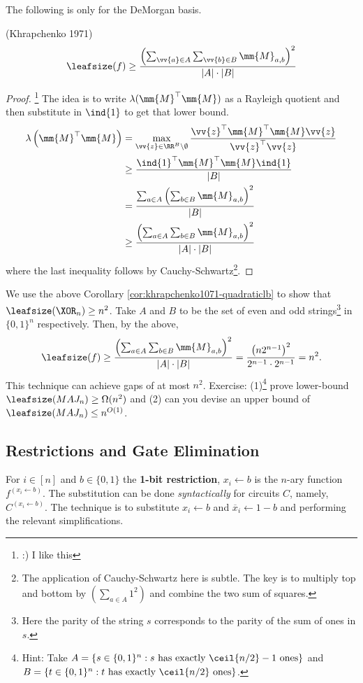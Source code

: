 The following is only for the DeMorgan basis.
\begin{corollary}
	\label{cor:khrapchenko1071-quadraticlb}
	(Khrapchenko 1971)
	\[\leafsize(f) \geq \frac{\left(\sum_{\vv{a} \in A}\sum_{\vv{b} \in B} \mm{M}_{a,b}\right)^2}{|A|\cdot|B|}\]
\end{corollary}
\begin{proof}
	\footnote{:) I like this} The idea is to write $\lambda(\mm{M}^{\top}\mm{M})$ as a Rayleigh quotient and then substitute in $\ind{1}$ to get that lower bound.
	\begin{align*}
		\lambda\left(\mm{M}^{\top}\mm{M}\right) &= \max_{\vv{z} \in \RR^{B}\backslash \emptyset} \frac{\vv{z}^{\top}\mm{M}^{\top}\mm{M}\vv{z}}{\vv{z}^{\top}\vv{z}}\\
		&\geq \frac{\ind{1}^{\top}\mm{M}^{\top}\mm{M}\ind{1}}{|B|}\\
		&=\frac{\sum_{a \in A}\left(\sum_{b \in B}\mm{M}_{a,b}\right)^2}{|B|}\\
		&\geq \frac{\left(\sum_{a \in A} \sum_{b \in B} \mm{M}_{a,b}\right)^2}{|A|\cdot|B|}
	\end{align*}
	where the last inequality follows by Cauchy-Schwartz\footnote{The application of Cauchy-Schwartz here is subtle. The key is to multiply top and bottom by $\left(\sum_{a \in A} 1^2\right)$ and combine the two sum of squares.}.
\end{proof}

We use the above Corollary \ref{cor:khrapchenko1071-quadraticlb} to show that $\leafsize(\XOR_n) \geq n^2$. Take $A$ and $B$ to be the set of even and odd strings\footnote{Here the parity of the string $s$ corresponds to the parity of the sum of ones in $s$.} in $\{0,1\}^n$ respectively. Then, by the above,
\[\leafsize(f) \geq \frac{\left(\sum_{a \in A}\sum_{b \in B} \mm{M}_{a,b}\right)^2}{|A|\cdot|B|} = \frac{\left(n2^{n-1}\right)^2}{2^{n-1}\cdot 2^{n-1}} = n^2.\]
This technique can achieve gaps of at most $n^2$. Exercise: (1)\footnote{Hint: Take $A = \{s \in \{0,1\}^n:s\mbox{ has exactly $\ceil{n/2}-1$ ones}\}$ and $B = \{t \in \{0,1\}^n:t\mbox{ has exactly $\ceil{n/2}$ ones}\}$.} prove lower-bound $\leafsize(MAJ_n) \geq \Omega(n^2)$ and (2) can you devise an upper bound of $\leafsize(MAJ_n) \leq n^{O(1)}$.

\subsection{Restrictions and Gate Elimination}
\begin{definition}
	For $i \in [n]$ and $b \in \{0,1\}$ the \textbf{1-bit restriction}, $x_i \leftarrow b$ is the $n$-ary function $f^{(x_i \leftarrow b)}$. The substitution can be done \emph{syntactically} for circuits $C$, namely, $C^{(x_i \leftarrow b)}$. The technique is to substitute $x_i \leftarrow b$ and $\overline{x}_i \leftarrow 1 - b$ and performing the relevant simplifications.
\end{definition}

